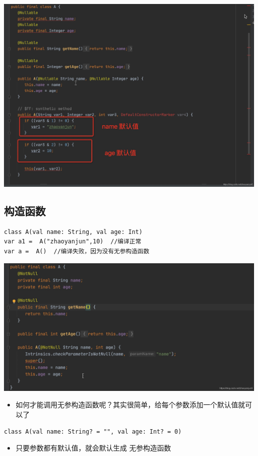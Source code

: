 \documentclass[9pt, b5paper]{article}
\begin{document}
\includegraphics[width=.9\linewidth]{./pic/eg8.png}

\subsection{构造函数}
\label{sec-5-5}
\begin{verbatim}
class A(val name: String, val age: Int)
var a1 =  A("zhaoyanjun",10)  //编译正常
var a =  A()  //编译失败，因为没有无参构造函数
\end{verbatim}

\includegraphics[width=.9\linewidth]{./pic/eg9.png}


\begin{itemize}
\item 如何才能调用无参构造函数呢？其实很简单，给每个参数添加一个默认值就可以了
\end{itemize}
\begin{verbatim}
class A(val name: String? = "", val age: Int? = 0)
\end{verbatim}
\begin{itemize}
\item 只要参数都有默认值，就会默认生成 无参构造函数
\end{itemize}
\end{document}
